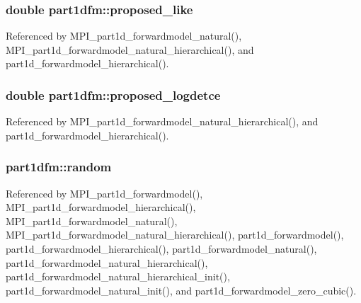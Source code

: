 \subsubsection[{\texorpdfstring{proposed\+\_\+like}{proposed_like}}]{\setlength{\rightskip}{0pt plus 5cm}double part1dfm\+::proposed\+\_\+like}\hypertarget{structpart1dfm_ad995ce7712c33b1710c8e250221f62a0}{}\label{structpart1dfm_ad995ce7712c33b1710c8e250221f62a0}


Referenced by M\+P\+I\+\_\+part1d\+\_\+forwardmodel\+\_\+natural(), M\+P\+I\+\_\+part1d\+\_\+forwardmodel\+\_\+natural\+\_\+hierarchical(), and part1d\+\_\+forwardmodel\+\_\+hierarchical().

\subsubsection[{\texorpdfstring{proposed\+\_\+logdetce}{proposed_logdetce}}]{\setlength{\rightskip}{0pt plus 5cm}double part1dfm\+::proposed\+\_\+logdetce}\hypertarget{structpart1dfm_a2f03ff0e7c16c73a4e3c109e559ed9af}{}\label{structpart1dfm_a2f03ff0e7c16c73a4e3c109e559ed9af}


Referenced by M\+P\+I\+\_\+part1d\+\_\+forwardmodel\+\_\+natural\+\_\+hierarchical(), and part1d\+\_\+forwardmodel\+\_\+hierarchical().

\subsubsection[{\texorpdfstring{random}{random}}]{ part1dfm\+::random}\hypertarget{structpart1dfm_a809000639489a661f35c6cd1151bb5e2}{}\label{structpart1dfm_a809000639489a661f35c6cd1151bb5e2}


Referenced by M\+P\+I\+\_\+part1d\+\_\+forwardmodel(), M\+P\+I\+\_\+part1d\+\_\+forwardmodel\+\_\+hierarchical(), M\+P\+I\+\_\+part1d\+\_\+forwardmodel\+\_\+natural(), M\+P\+I\+\_\+part1d\+\_\+forwardmodel\+\_\+natural\+\_\+hierarchical(), part1d\+\_\+forwardmodel(), part1d\+\_\+forwardmodel\+\_\+hierarchical(), part1d\+\_\+forwardmodel\+\_\+natural(), part1d\+\_\+forwardmodel\+\_\+natural\+\_\+hierarchical(), part1d\+\_\+forwardmodel\+\_\+natural\+\_\+hierarchical\+\_\+init(), part1d\+\_\+forwardmodel\+\_\+natural\+\_\+init(), and part1d\+\_\+forwardmodel\+\_\+zero\+\_\+cubic().

